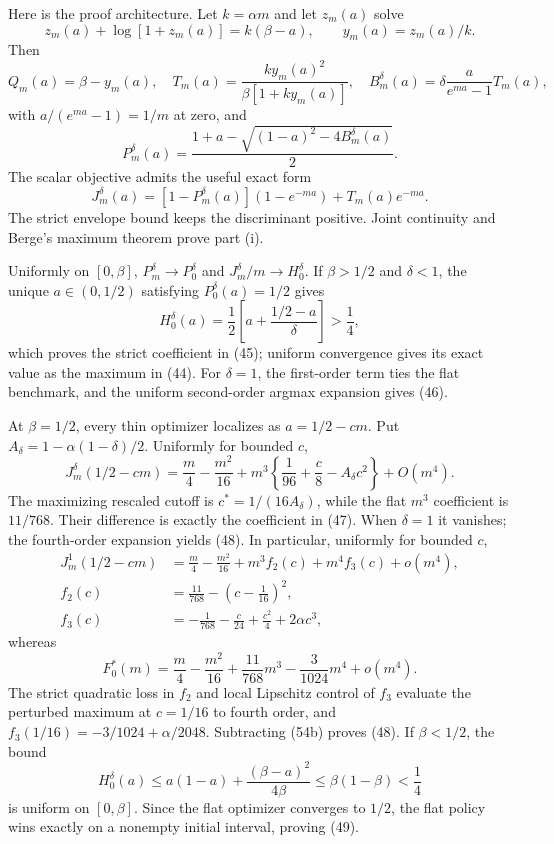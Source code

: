 \documentclass[mnsc,blindrev]{informs3}
\begin{document}
Here is the proof architecture.  Let $k=\alpha m$ and let $z_m(a)$ solve
\[
 z_m(a)+\log[1+z_m(a)]=k(\beta-a),
 \qquad y_m(a)=z_m(a)/k.
\]
Then
\[
 Q_m(a)=\beta-y_m(a),\quad
 T_m(a)=\frac{k y_m(a)^2}{\beta[1+k y_m(a)]},\quad
 B_m^\delta(a)=\delta\frac{a}{e^{ma}-1}T_m(a),             \tag{51}
\]
with $a/(e^{ma}-1)=1/m$ at zero, and
\[
 P_m^\delta(a)=
 \frac{1+a-\sqrt{(1-a)^2-4B_m^\delta(a)}}2.               \tag{52}
\]
The scalar objective admits the useful exact form
\[
 J_m^\delta(a)
 =[1-P_m^\delta(a)](1-e^{-ma})+T_m(a)e^{-ma}.              \tag{53}
\]
The strict envelope bound keeps the discriminant positive.  Joint
continuity and Berge's maximum theorem prove part (i).

Uniformly on $[0,\beta]$, $P_m^\delta\to P_0^\delta$ and
$J_m^\delta/m\to H_0^\delta$.  If $\beta>1/2$ and $\delta<1$, the unique
$a\in(0,1/2)$ satisfying $P_0^\delta(a)=1/2$ gives
\[
 H_0^\delta(a)=\frac12\left[a+\frac{1/2-a}{\delta}\right]
 >\frac14,
\]
which proves the strict coefficient in (45); uniform convergence gives its
exact value as the maximum in (44).  For $\delta=1$, the first-order term
ties the flat benchmark, and the uniform second-order argmax expansion gives
(46).

At $\beta=1/2$, every thin optimizer localizes as $a=1/2-cm$.  Put
$A_\delta=1-\alpha(1-\delta)/2$.  Uniformly for bounded $c$,
\[
 J_m^\delta(1/2-cm)
 =\frac m4-\frac{m^2}{16}
 +m^3\left\{\frac1{96}+\frac c8-A_\delta c^2\right\}
 +O(m^4).                                                   \tag{54}
\]
The maximizing rescaled cutoff is $c^*=1/(16A_\delta)$, while the flat
$m^3$ coefficient is $11/768$.  Their difference is exactly the coefficient
in (47).  When $\delta=1$ it vanishes; the fourth-order expansion yields
(48).  In particular, uniformly for bounded $c$,
\[
 \begin{aligned}
 J_m^1(1/2-cm)
 &=\frac m4-\frac{m^2}{16}+m^3 f_2(c)+m^4 f_3(c)+o(m^4),\\
 f_2(c)&=\frac{11}{768}-\left(c-\frac1{16}\right)^2,\\
 f_3(c)&=-\frac1{768}-\frac c{24}+\frac{c^2}{4}+2\alpha c^3,
 \end{aligned}                                             \tag{54a}
\]
whereas
\[
 F_0^*(m)=\frac m4-\frac{m^2}{16}
 +\frac{11}{768}m^3-\frac3{1024}m^4+o(m^4).              \tag{54b}
\]
The strict quadratic loss in $f_2$ and local Lipschitz control of $f_3$
evaluate the perturbed maximum at $c=1/16$ to fourth order, and
$f_3(1/16)=-3/1024+\alpha/2048$.  Subtracting (54b) proves (48).
If $\beta<1/2$, the bound
\[
 H_0^\delta(a)
 \le a(1-a)+\frac{(\beta-a)^2}{4\beta}
 \le\beta(1-\beta)<\frac14
\]
is uniform on $[0,\beta]$.  Since the flat optimizer converges to $1/2$,
the flat policy wins exactly on a nonempty initial interval, proving (49).
\end{document}
